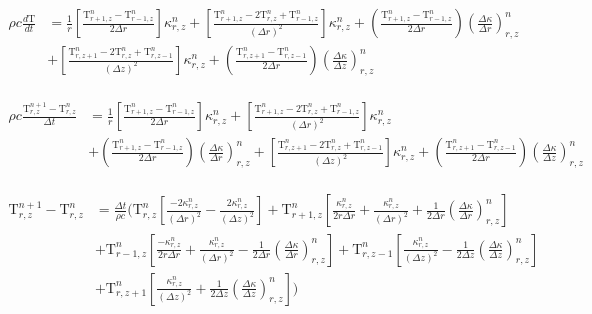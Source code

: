 \documentclass[12pt]{article}
\begin{document}
\begin{equation}
  \begin{aligned}
    \rho c \frac{d\mathrm{T}}{dt} &= \frac{1}{r} \left [\frac{\mathrm{T}^{n}_{r + 1, z} - \mathrm{T}^{n}_{r - 1, z}}{2\Delta r}  \right ]\kappa^{n}_{r, z} + \left [\frac{\mathrm{T}^{n}_{r + 1, z}  - 2 \mathrm{T}^{n}_{r, z} +  \mathrm{T}^{n}_{r - 1, z}}{(\Delta r)^2} \right ]  \kappa^{n}_{r, z} + (\frac{\mathrm{T}^{n}_{r + 1, z} - \mathrm{T}^{n}_{r - 1, z}}{2\Delta r}) (\frac{\Delta \kappa}{\Delta r})^n_{r, z} \\
    &+ \left [\frac{\mathrm{T}^{n}_{r, z + 1}  - 2 \mathrm{T}^{n}_{r, z} +  \mathrm{T}^{n}_{r, z -1}}{(\Delta z)^2} \right ]\kappa^n_{r, z} + (\frac{\mathrm{T}^{n}_{r, z + 1} - \mathrm{T}^{n}_{r, z - 1}}{2\Delta r})(\frac{\Delta \kappa}{\Delta z})^n_{r, z} \\
  \end{aligned}
\end{equation}

\begin{equation}
  \begin{aligned}
    \rho c \frac{\mathrm{T}^{n+1}_{r, z} - \mathrm{T}^{n}_{r, z}}{\Delta t} &= \frac{1}{r} \left [\frac{\mathrm{T}^{n}_{r + 1, z} - \mathrm{T}^{n}_{r - 1, z}}{2\Delta r}  \right ]\kappa^{n}_{r, z} + \left [\frac{\mathrm{T}^{n}_{r + 1, z}  - 2 \mathrm{T}^{n}_{r, z} +  \mathrm{T}^{n}_{r - 1, z}}{(\Delta r)^2} \right ]  \kappa^{n}_{r, z}  \\
    &+ (\frac{\mathrm{T}^{n}_{r + 1, z} - \mathrm{T}^{n}_{r - 1, z}}{2\Delta r}) (\frac{\Delta \kappa}{\Delta r})^n_{r, z}  + \left [\frac{\mathrm{T}^{n}_{r, z + 1}  - 2 \mathrm{T}^{n}_{r, z} +  \mathrm{T}^{n}_{r, z -1}}{(\Delta z)^2} \right ]\kappa^n_{r, z} + (\frac{\mathrm{T}^{n}_{r, z + 1} - \mathrm{T}^{n}_{r, z - 1}}{2\Delta r})(\frac{\Delta \kappa}{\Delta z})^n_{r, z} \\
  \end{aligned}
\end{equation}

\begin{equation}
  \begin{aligned}
    \mathrm{T}^{n+1}_{r, z} - \mathrm{T}^{n}_{r, z} &= \frac{\Delta t}{\rho c}(\mathrm{T}^{n}_{r, z} \left [\frac{-2\kappa^n_{r, z}}{(\Delta r)^2} -\frac{2\kappa^n_{r, z}}{(\Delta z)^2}  \right ] + \mathrm{T}^{n}_{r + 1, z} \left [\frac{\kappa^n_{r, z}}{2r\Delta r} + \frac{\kappa^n_{r, z}}{(\Delta r)^2} + \frac{1}{2\Delta r}(\frac{\Delta\kappa}{\Delta r})^n_{r, z} \right ] \\
    &+ \mathrm{T}^{n}_{r - 1, z} \left [\frac{-\kappa^n_{r, z}}{2r\Delta r} + \frac{\kappa^n_{r, z}}{(\Delta r)^2} - \frac{1}{2\Delta r}(\frac{\Delta\kappa}{\Delta r})^n_{r, z} \right ] + \mathrm{T}^{n}_{r, z - 1} \left [\frac{\kappa^n_{r, z}}{(\Delta z)^2} - \frac{1}{2\Delta z}(\frac{\Delta\kappa}{\Delta z})^n_{r, z}  \right ] \\
    &+ \mathrm{T}^{n}_{r, z + 1} \left [ \frac{\kappa^n_{r, z}}{(\Delta z)^2} + \frac{1}{2\Delta z}(\frac{\Delta\kappa}{\Delta z})^n_{r, z} \right ]) \\
  \end{aligned}
\end{equation}
\end{document}
